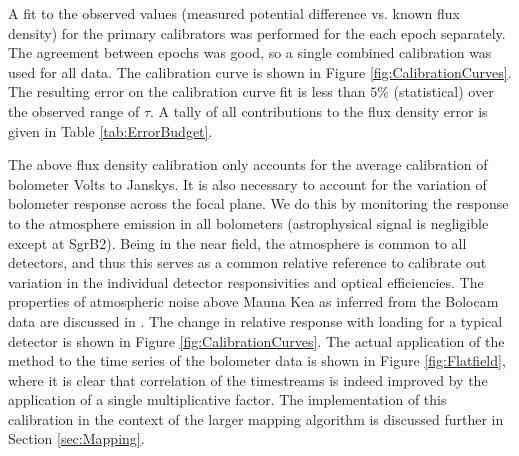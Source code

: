 \documentclass{emulateapj}
\def\Check#1{{\tt #1}}
\begin{document}
%

A fit to the observed values (measured potential difference vs. known
flux density) for the primary calibrators was performed for the each
epoch separately.
The agreement between epochs was good, so a single combined
calibration was used for all data.
The calibration curve is shown in Figure \ref{fig:CalibrationCurves}.
The resulting error on the calibration curve fit is less than
$5\%$ (statistical) over the observed range of $\tau$.  A tally of all
contributions to the flux density error is given in Table
\ref{tab:ErrorBudget}.

The above flux density calibration only accounts for the average
calibration of bolometer Volts to Janskys.  It is also necessary to
account for the variation of bolometer response across the focal
plane.  We do this by monitoring the response to the atmosphere
emission in all bolometers (astrophysical signal is negligible except
at SgrB2).  Being in the near field, the atmosphere is common to all
detectors, and thus this serves as a common relative reference to
calibrate out variation in the individual detector responsivities and
optical efficiencies.  The properties of atmospheric noise above Mauna
Kea as inferred from the Bolocam data are discussed in
\citet{sayers09b}.  The change in relative response with loading for a
typical detector is shown in Figure \ref{fig:CalibrationCurves}.  The
actual application of the method to the time series of the bolometer
data is shown in Figure \ref{fig:Flatfield}, where it is clear that
correlation of the timestreams is indeed improved by the application
of a single multiplicative factor.  The implementation of this
calibration in the context of the larger mapping algorithm is
discussed further in Section \ref{sec:Mapping}.
\end{document}
